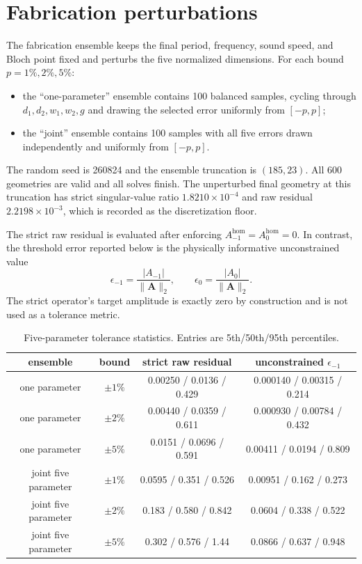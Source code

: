 \documentclass[aps,prl,reprint,superscriptaddress,nofootinbib,floatfix]{revtex4-2}
\providecommand{\hom}{\mathrm{hom}}
\begin{document}
\section{Fabrication perturbations}

The fabrication ensemble keeps the final period, frequency, sound speed, and
Bloch point fixed and perturbs the five normalized dimensions.  For each
bound $p=1\%,2\%,5\%$:
\begin{itemize}
\item the ``one-parameter'' ensemble contains 100 balanced samples, cycling
through $d_1,d_2,w_1,w_2,g$ and drawing the selected error uniformly from
$[-p,p]$;
\item the ``joint'' ensemble contains 100 samples with all five errors drawn
independently and uniformly from $[-p,p]$.
\end{itemize}
The random seed is 260824 and the ensemble truncation is $(185,23)$.  All 600
geometries are valid and all solves finish.  The unperturbed final geometry at
this truncation has strict singular-value ratio $1.8210\times10^{-4}$ and raw
residual $2.2198\times10^{-3}$, which is recorded as the discretization floor.

The strict raw residual is evaluated after enforcing
$A_{-1}^{\hom}=A_0^{\hom}=0$.  In contrast, the threshold error reported below
is the physically informative unconstrained value
\begin{equation}
 \epsilon_{-1}=\frac{|A_{-1}|}{\|\bm A\|_2},\qquad
 \epsilon_0=\frac{|A_0|}{\|\bm A\|_2}.                                 \label{eq:s-tol-errors}
\end{equation}
The strict operator's target amplitude is exactly zero by construction and is
not used as a tolerance metric.

\begin{table}[t]
\caption{\label{tab:s-tolerance}Five-parameter tolerance statistics.  Entries
are 5th/50th/95th percentiles.}
\begin{ruledtabular}
\begin{tabular}{cccc}
ensemble & bound & strict raw residual & unconstrained $\epsilon_{-1}$\\
\hline
one parameter & $\pm1\%$ & 0.00250 / 0.0136 / 0.429 & 0.000140 / 0.00315 / 0.214\\
one parameter & $\pm2\%$ & 0.00440 / 0.0359 / 0.611 & 0.000930 / 0.00784 / 0.432\\
one parameter & $\pm5\%$ & 0.0151 / 0.0696 / 0.591 & 0.00411 / 0.0194 / 0.809\\
joint five parameter & $\pm1\%$ & 0.0595 / 0.351 / 0.526 & 0.00951 / 0.162 / 0.273\\
joint five parameter & $\pm2\%$ & 0.183 / 0.580 / 0.842 & 0.0604 / 0.338 / 0.522\\
joint five parameter & $\pm5\%$ & 0.302 / 0.576 / 1.44 & 0.0866 / 0.637 / 0.948\\
\end{tabular}
\end{ruledtabular}
\end{table}
\end{document}
